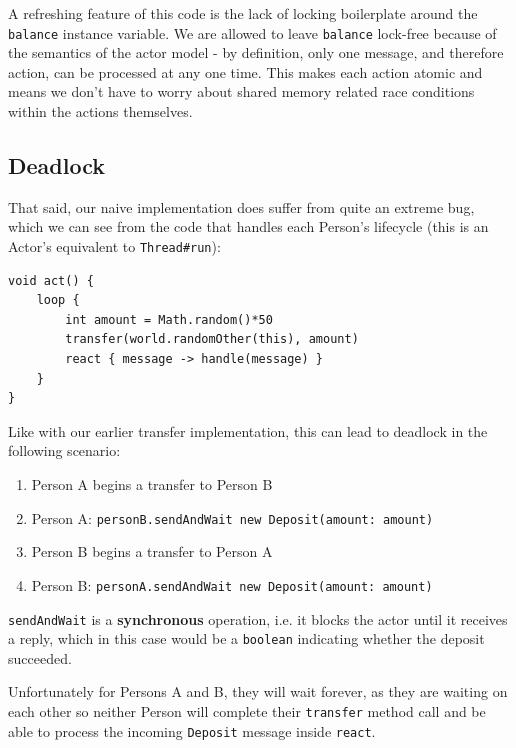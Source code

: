 \documentclass[a4paper,12pt]{kth-mag}
\begin{document}
A refreshing feature of this code is the lack of locking boilerplate around the \texttt{balance} instance variable. We are allowed to leave \texttt{balance} lock-free because of the semantics of the actor model - by definition, only one message, and therefore action, can be processed at any one time. This makes each action atomic and means we don't have to worry about shared memory related race conditions within the actions themselves.

\subsection{Deadlock}

That said, our naive implementation does suffer from quite an extreme bug, which we can see from the code that handles each Person's lifecycle (this is an Actor's equivalent to \texttt{Thread\#run}):

\begin{listing}[H]
	\begin{verbatim}
void act() {
    loop {
        int amount = Math.random()*50
        transfer(world.randomOther(this), amount)
        react { message -> handle(message) }
    }
}
	\end{verbatim}
\end{listing}

Like with our earlier transfer implementation, this can lead to deadlock in the following scenario:

\begin{enumerate}
\item Person A begins a transfer to Person B
\item Person A: \texttt{personB.sendAndWait new Deposit(amount: amount)}
\item Person B begins a transfer to Person A
\item Person B: \texttt{personA.sendAndWait new Deposit(amount: amount)}
\end{enumerate}

\texttt{sendAndWait} is a \textbf{synchronous} operation, i.e. it blocks the actor until it receives a reply, which in this case would be a \texttt{boolean} indicating whether the deposit succeeded.

Unfortunately for Persons A and B, they will wait forever, as they are waiting on each other so neither Person will complete their \texttt{transfer} method call and be able to process the incoming \texttt{Deposit} message inside \texttt{react}.
\end{document}
